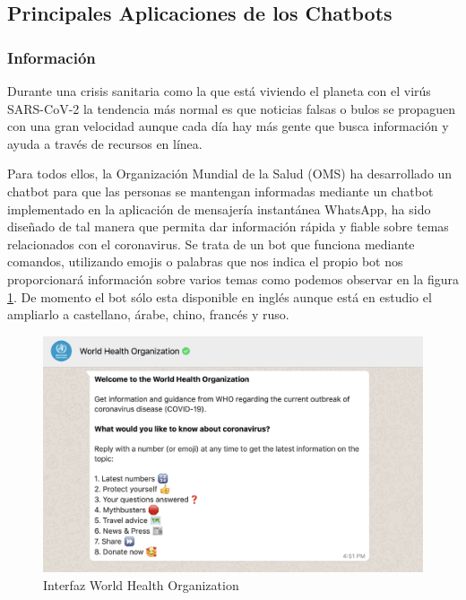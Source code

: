 \subsection{Principales Aplicaciones de los Chatbots}

\subsubsection{Información}
Durante una crisis sanitaria como la que está viviendo el planeta con el virús SARS-CoV-2 la tendencia más normal es que noticias falsas o bulos se propaguen con una gran velocidad aunque cada día hay más gente que busca información y ayuda a través de recursos en línea. 

Para todos ellos, la Organización Mundial de la Salud (OMS) \cite{oms} ha desarrollado un chatbot para que las personas se mantengan informadas mediante un chatbot implementado en la aplicación de mensajería instantánea WhatsApp, ha sido diseñado de tal manera que permita dar información rápida y fiable sobre temas relacionados con el coronavirus. Se trata de un bot que funciona mediante comandos, utilizando emojis o palabras que nos indica el propio bot nos proporcionará información sobre varios temas como podemos observar en la figura \ref{fig:oms}. De momento el bot sólo esta disponible en inglés aunque está en estudio el ampliarlo a castellano, árabe, chino, francés y ruso.

\begin{figure}[H]
    \centering
    \includegraphics[scale=0.6]{include/figuras/oms.png}
    \caption{Interfaz World Health Organization}
    \label{fig:oms}
\end{figure}

